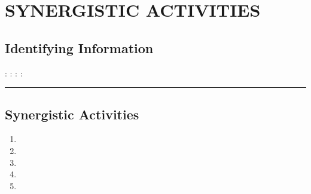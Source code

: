 \documentclass[../preamble.tex]{subfiles}
\begin{document}
\section{SYNERGISTIC ACTIVITIES}



\subsection*{Identifying Information}
: %
:
:
: %
\pn\rule{\textwidth}{0.4pt}
\subsection*{Synergistic Activities}
\begin{enumerate}
    \item 
    \item 
    \item 
    \item 
    \item 
\end{enumerate}
\end{document}
